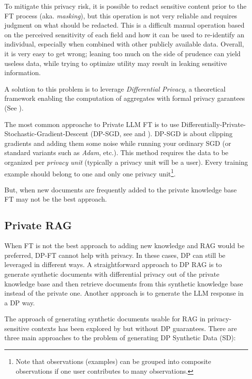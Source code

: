 \documentclass[conference]{IEEEtran}
\begin{document}
To mitigate this privacy risk, it is possible to redact sensitive
content prior to the FT process (aka. \emph{masking}), but this
operation is not very reliable and requires judgment on what should be
redacted. This is a difficult manual operation based on the perceived
sensitivity of each field and how it can be used to re-identify an
individual, especially when combined with other publicly available data.
Overall, it is very easy to get wrong; leaning too much on the side of
prudence can yield useless data, while trying to optimize utility may
result in leaking sensitive information.

A solution to this problem is to leverage \emph{Differential Privacy}, a
theoretical framework enabling the computation of aggregates with formal
privacy garantees (See \cite{ref-dwork2014algorithmic}).

The most common approache to Private LLM FT is to use
Differentially-Private-Stochastic-Gradient-Descent (DP-SGD, see \cite{ref-Abadi_2016}
and \cite{ref-Ponomareva_2023}). DP-SGD is about clipping
gradients and adding them some noise while running your ordinary SGD (or
standard variants such as \emph{Adam}, etc.). This method requires the
data to be organized per \emph{privacy unit} (typically a privacy unit
will be a user). Every training example should belong to one and only
one privacy unit\footnote{Note that observations (examples) can be
  grouped into composite observations if one user contributes to many
  observations.}.

But, when new documents are frequently added to the private knowledge
base FT may not be the best approach.

\subsection{Private RAG}\label{private-rag}

When FT is not the best approach to adding new knowledge and RAG would
be preferred, DP-FT cannot help with privacy. In these cases, DP can
still be leveraged in different ways. A straightforward approach to DP
RAG is to generate synthetic documents with differential privacy out of
the private knowledge base and then retrieve documents from this
synthetic knowledge base instead of the private one. Another approach is
to generate the LLM response in a DP way.

The approach of generating synthetic documents usable for RAG in
privacy-sensitive contexts has been explored by \cite{ref-zeng2024mitigatingprivacyissuesretrievalaugmented} but
without DP guarantees. There are three main approaches to the problem of
generating DP Synthetic Data (SD):
\end{document}
